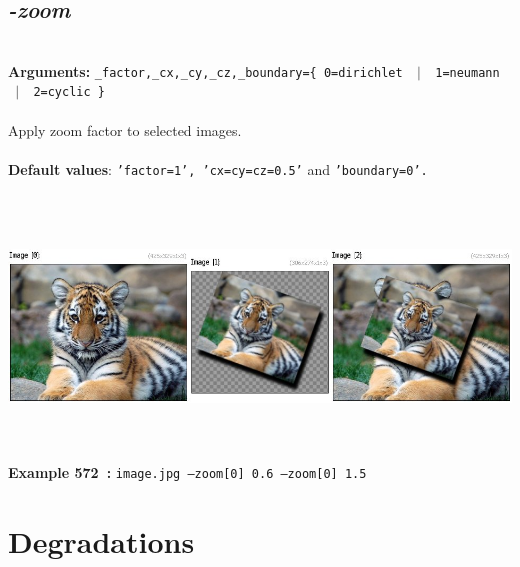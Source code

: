 \documentclass[a4paper,11pt,twoside]{book}
\begin{document}
\subsection{\emph{-zoom} }\vspace*{-0.5em}
~\\\textbf{Arguments: } 
{\small \texttt{\_factor,\_cx,\_cy,\_cz,\_boundary=\{ 0=dirichlet ~$|$~ 1=neumann ~$|$~ 2=cyclic \}}}\\~\\
Apply zoom factor to selected images.
~\\~\\\textbf{Default values}: {\small \texttt{'factor=1', 'cx=cy=cz=0.5'} and \texttt{'boundary=0'.}}
\begin{center}\includegraphics[keepaspectratio=true,height=7cm,width=\textwidth]{img/gmic_def572.jpg}\\
{\footnotesize \textbf{Example 572~:} \texttt{image.jpg --zoom[0] 0.6 --zoom[0] 1.5}}
\end{center}
\section{Degradations}
\end{document}
